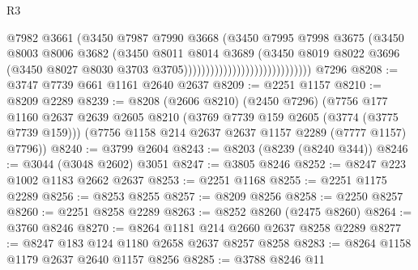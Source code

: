 \begin{lexlean}{R3}
\begin{coremodule}
                                                  @7982
                                                  @3661
                                                  (@3450
                                                    @7987
                                                    @7990
                                                    @3668
                                                    (@3450
                                                      @7995
                                                      @7998
                                                      @3675
                                                      (@3450
                                                        @8003
                                                        @8006
                                                        @3682
                                                        (@3450
                                                          @8011
                                                          @8014
                                                          @3689
                                                          (@3450
                                                            @8019
                                                            @8022
                                                            @3696
                                                            (@3450
                                                              @8027
                                                              @8030
                                                              @3703
                                                              @3705)))))))))))))))))))))))))))))
    @7296
@8208 := @3747 @7739 @661 @1161 @2640 @2637
@8209 := @2251 @1157
@8210 := @8209 @2289
@8239 := @8208
    (@2606 @8210)
    (@2450 @7296)
    (@7756
      @177
      @1160
      @2637
      @2639
      @2605
      @8210
      (@3769 @7739 @159 @2605 (@3774 (@3775 @7739 @159)))
      (@7756 @1158 @214 @2637 @2637 @1157 @2289 (@7777 @1157) @7796))
@8240 := @3799 @2604
@8243 := @8203 (@8239 (@8240 @344))
@8246 := @3044 (@3048 @2602) @3051
@8247 := @3805 @8246
@8252 := @8247 @223 @1002 @1183 @2662 @2637
@8253 := @2251 @1168
@8255 := @2251 @1175 @2289
@8256 := @8253 @8255
@8257 := @8209 @8256
@8258 := @2250 @8257
@8260 := @2251 @8258 @2289
@8263 := @8252 @8260 (@2475 @8260)
@8264 := @3760 @8246
@8270 := @8264 @1181 @214 @2660 @2637 @8258 @2289
@8277 := @8247 @183 @124 @1180 @2658 @2637 @8257 @8258
@8283 := @8264 @1158 @1179 @2637 @2640 @1157 @8256
@8285 := @3788 @8246 @11

\end{coremodule}
\end{lexlean}
